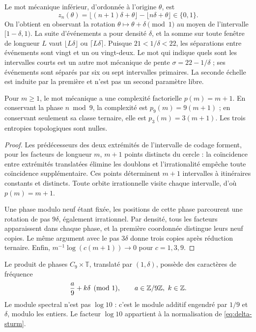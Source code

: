 Le mot mécanique inférieur, d'ordonnée à l'origine \(\theta\), est
\[
 z_n(\theta)=\lfloor(n+1)\delta+\theta\rfloor-\lfloor n\delta+\theta\rfloor\in\{0,1\}.
\]
On l'obtient en observant la rotation \(\theta\mapsto\theta+\delta\pmod1\) au moyen de l'intervalle \([1-\delta,1)\). La suite d'événements a pour densité \(\delta\), et la somme sur toute fenêtre de longueur \(L\) vaut \(\lfloor L\delta\rfloor\) ou \(\lceil L\delta\rceil\). Puisque \(21<1/\delta<22\), les séparations entre événements sont vingt et un ou vingt-deux. Le mot qui indique quels sont les intervalles courts est un autre mot mécanique de pente \(\sigma=22-1/\delta\) ; ses événements sont séparés par six ou sept intervalles primaires. La seconde échelle est induite par la première et n'est pas un second paramètre libre.



\begin{theorem}
Pour \(m\ge1\), le mot mécanique a une complexité factorielle \(p(m)=m+1\). En conservant la phase \(n\bmod9\), la complexité est \(p_9(m)=9(m+1)\) ; en conservant seulement sa classe ternaire, elle est \(p_3(m)=3(m+1)\). Les trois entropies topologiques sont nulles.
\end{theorem}
\begin{proof}
Les prédécesseurs des deux extrémités de l'intervalle de codage forment, pour les facteurs de longueur \(m\), \(m+1\) points distincts du cercle : la coïncidence entre extrémités translatées élimine les doublons et l'irrationalité empêche toute coïncidence supplémentaire. Ces points déterminent \(m+1\) intervalles à itinéraires constants et distincts. Toute orbite irrationnelle visite chaque intervalle, d'où \(p(m)=m+1\).

Une phase modulo neuf étant fixée, les positions de cette phase parcourent une rotation de pas \(9\delta\), également irrationnel. Par densité, tous les facteurs apparaissent dans chaque phase, et la première coordonnée distingue leurs neuf copies. Le même argument avec le pas \(3\delta\) donne trois copies après réduction ternaire. Enfin, \(m^{-1}\log(c(m+1))\to0\) pour \(c=1,3,9\).
\end{proof}

Le produit de phases \(C_9\times\mathbb T\), translaté par \((1,\delta)\), possède des caractères de fréquence
\[
 \frac a9+k\delta\pmod1,\qquad a\in\mathbb Z/9\mathbb Z,\ k\in\mathbb Z.
\]
Le module spectral n'est pas \(\log10\) : c'est le module additif engendré par \(1/9\) et \(\delta\), modulo les entiers. Le facteur \(\log10\) appartient à la normalisation de \eqref{eq:delta-sturm}.

